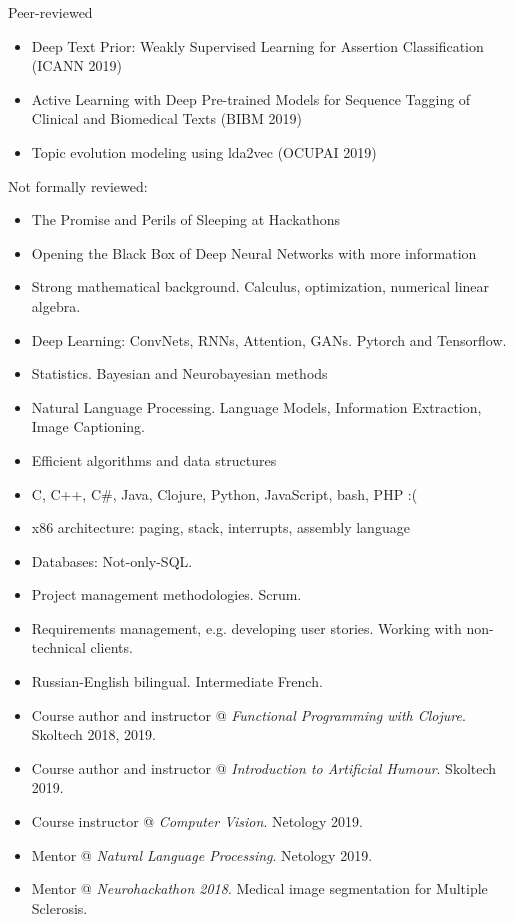 

Peer-reviewed

\begin{itemize}
    \item Deep Text Prior: Weakly Supervised Learning for Assertion Classification (ICANN 2019)
    \item Active Learning with Deep Pre-trained Models for Sequence Tagging of Clinical and Biomedical Texts (BIBM 2019)
    \item Topic evolution modeling using lda2vec (OCUPAI 2019\footnotemark)
\end{itemize}

Not formally reviewed:

\begin{itemize}
    \item The Promise and Perils of Sleeping at Hackathons\footnotemark
    \item Opening the Black Box of Deep Neural Networks with more information \footnotemark
\end{itemize}


\begin{itemize}
    \item Strong mathematical background. Calculus, optimization, numerical linear algebra.
    \item Deep Learning: ConvNets, RNNs, Attention, GANs. Pytorch and Tensorflow.
    \item Statistics. Bayesian and Neurobayesian methods
    \item Natural Language Processing. Language Models, Information Extraction, Image Captioning.
    \item Efficient algorithms and data structures
    \item C, C++, C\#, Java, Clojure, Python, JavaScript, bash, PHP :(
    \item x86 architecture: paging, stack, interrupts, assembly language
    \item Databases: Not-only-SQL.
    \item Project management methodologies. Scrum.
    \item Requirements management, e.g. developing user stories. Working with non-technical clients.
    \item Russian-English bilingual. Intermediate French.
\end{itemize}

\begin{itemize}
    \item Course author and instructor @ \emph{Functional Programming with Clojure}. Skoltech 2018, 2019. 
    \item Course author and instructor @ \emph{Introduction to Artificial Humour}. Skoltech 2019.
    \item Course instructor @ \emph{Computer Vision}. Netology 2019.
    \item Mentor @ \emph{Natural Language Processing}. Netology 2019.
    \item Mentor @ \emph{Neurohackathon 2018}. Medical image segmentation for Multiple Sclerosis.
\end{itemize}

